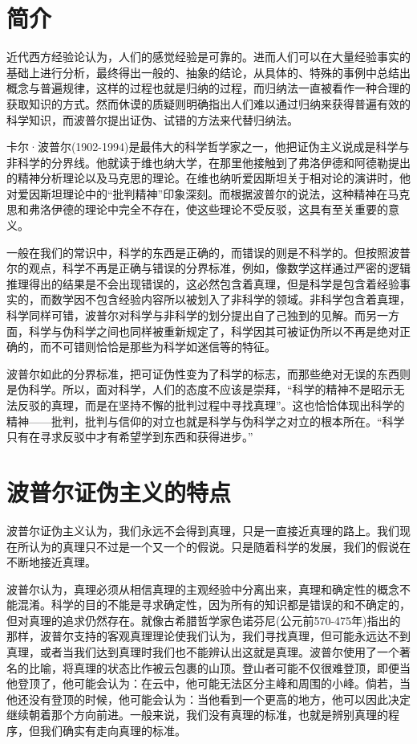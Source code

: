 \documentclass[]{article}
\begin{document}
\begin{multicols}{2} 
	
\section{简介}
近代西方经验论认为，人们的感觉经验是可靠的。进而人们可以在大量经验事实的基础上进行分析，最终得出一般的、抽象的结论，从具体的、特殊的事例中总结出概念与普遍规律，这样的过程也就是归纳的过程，而归纳法一直被看作一种合理的获取知识的方式。然而休谟的质疑则明确指出人们难以通过归纳来获得普遍有效的科学知识，而波普尔提出证伪、试错的方法来代替归纳法\cite{王飞2015波普尔证伪主义科学发展模式的解读}。

卡尔·波普尔(1902-1994)是最伟大的科学哲学家之一，他把证伪主义说成是科学与非科学的分界线。他就读于维也纳大学，在那里他接触到了弗洛伊德和阿德勒提出的精神分析理论以及马克思的理论。在维也纳听爱因斯坦关于相对论的演讲时，他对爱因斯坦理论中的“批判精神”印象深刻。而根据波普尔的说法，这种精神在马克思和弗洛伊德的理论中完全不存在，使这些理论不受反驳，这具有至关重要的意义。

一般在我们的常识中，科学的东西是正确的，而错误的则是不科学的。但按照波普尔的观点，科学不再是正确与错误的分界标准，例如，像数学这样通过严密的逻辑推理得出的结果是不会出现错误的，这必然包含着真理，但是科学是包含着经验事实的，而数学因不包含经验内容所以被划入了非科学的领域。非科学包含着真理，科学同样可错，波普尔对科学与非科学的划分提出自了己独到的见解。而另一方面，科学与伪科学之间也同样被重新规定了，科学因其可被证伪所以不再是绝对正确的，而不可错则恰恰是那些为科学如迷信等的特征。

波普尔如此的分界标准，把可证伪性变为了科学的标志，而那些绝对无误的东西则是伪科学。所以，面对科学，人们的态度不应该是崇拜，“科学的精神不是昭示无法反驳的真理，而是在坚持不懈的批判过程中寻找真理”。这也恰恰体现出科学的精神——批判，批判与信仰的对立也就是科学与伪科学之对立的根本所在。“科学只有在寻求反驳中才有希望学到东西和获得进步。”\cite{波珀1986科学发现的逻辑}

\section{波普尔证伪主义的特点}

波普尔证伪主义认为，我们永远不会得到真理，只是一直接近真理的路上。我们现在所认为的真理只不过是一个又一个的假说。只是随着科学的发展，我们的假说在不断地接近真理。

波普尔认为，真理必须从相信真理的主观经验中分离出来，真理和确定性的概念不能混淆。科学的目的不能是寻求确定性，因为所有的知识都是错误的和不确定的，但对真理的追求仍然存在。就像古希腊哲学家色诺芬尼(公元前570-475年)\cite{2014Falsifications}指出的那样，波普尔支持的客观真理理论使我们认为，我们寻找真理，但可能永远达不到真理，或者当我们达到真理时我们也不能辨认出这就是真理。波普尔使用了一个著名的比喻，将真理的状态比作被云包裹的山顶。登山者可能不仅很难登顶，即便当他登顶了，他可能会认为：在云中，他可能无法区分主峰和周围的小峰。倘若，当他还没有登顶的时候，他可能会认为：当他看到一个更高的地方，他可以因此决定继续朝着那个方向前进。一般来说，我们没有真理的标准，也就是辨别真理的程序，但我们确实有走向真理的标准。


\end{multicols}
\end{document}
